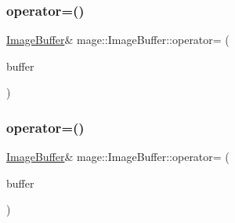\hypertarget{structmage_1_1_image_buffer_a4d89827bca3d3f2e748536b6b6a40470}{}\label{structmage_1_1_image_buffer_a4d89827bca3d3f2e748536b6b6a40470} 
\subsubsection{\texorpdfstring{operator=()}{operator=()}\hspace{0.1cm}{\footnotesize\ttfamily [1/2]}}
{\footnotesize\ttfamily \hyperlink{structmage_1_1_image_buffer}{Image\+Buffer}\& mage\+::\+Image\+Buffer\+::operator= (\begin{DoxyParamCaption}\item[{const \hyperlink{structmage_1_1_image_buffer}{Image\+Buffer} \&}]{buffer }\end{DoxyParamCaption})\hspace{0.3cm}{\ttfamily [delete]}}

\hypertarget{structmage_1_1_image_buffer_aa82afa518fa42edea4ada42b9adb92df}{}\label{structmage_1_1_image_buffer_aa82afa518fa42edea4ada42b9adb92df} 
\subsubsection{\texorpdfstring{operator=()}{operator=()}\hspace{0.1cm}{\footnotesize\ttfamily [2/2]}}
{\footnotesize\ttfamily \hyperlink{structmage_1_1_image_buffer}{Image\+Buffer}\& mage\+::\+Image\+Buffer\+::operator= (\begin{DoxyParamCaption}\item[{\hyperlink{structmage_1_1_image_buffer}{Image\+Buffer} \&\&}]{buffer }\end{DoxyParamCaption})\hspace{0.3cm}{\ttfamily [delete]}}

\hypertarget{structmage_1_1_image_buffer_aff1f615f00acd22d67ed2d10c33feb82}{}\label{structmage_1_1_image_buffer_aff1f615f00acd22d67ed2d10c33feb82} 
